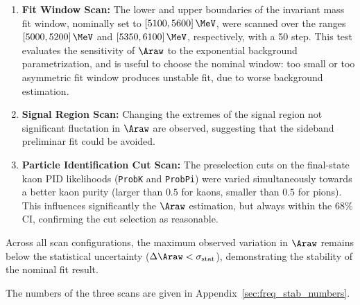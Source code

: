 \begin{enumerate}[leftmargin=*]
    \item \textbf{Fit Window Scan:} The lower and upper boundaries of the invariant mass fit window, nominally set to $[5100, 5600]\,\MeV$, were scanned over the ranges $[5000, 5200]\,\MeV$ and $[5350, 6100]\,\MeV$, respectively, with a 50 \MeV step. This test evaluates the sensitivity of $\Araw$ to the exponential background parametrization, and is useful to choose the nominal window: too small or too asymmetric fit window produces unstable fit, due to worse background estimation.

    \item \textbf{Signal Region Scan:} Changing the extremes of the signal region not significant fluctation in $\Araw$ are observed, suggesting that the sideband preliminar fit could be avoided.

    \item \textbf{Particle Identification Cut Scan:} The preselection cuts on the final-state kaon PID likelihoods (\texttt{ProbK} and \texttt{ProbPi}) were varied simultaneously towards a better kaon purity (larger than $0.5$ for kaons, smaller than $0.5$ for pions). This influences significantly the $\Araw$ estimation, but always within the $68\%$ CI, confirming the cut selection as reasonable.
\end{enumerate}

Across all scan configurations, the maximum observed variation in $\Araw$ remains below the statistical uncertainty ($\Delta \Araw < \sigma_{\mathrm{stat}}$), demonstrating the stability of the nominal fit result.

The numbers of the three scans are given in Appendix~\ref{sec:freq_stab_numbers}.
